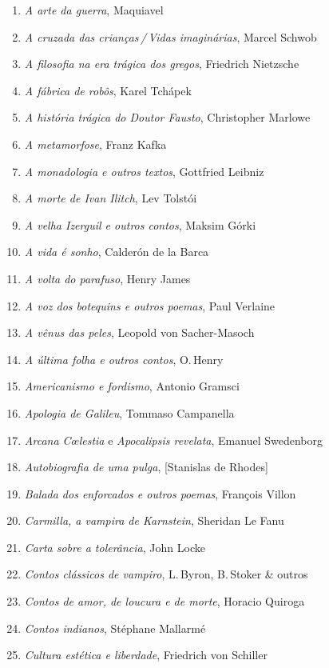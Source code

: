 \begin{enumerate}
\setlength{\topsep}{2pt}
\setlength{\partopsep}{0pt}
\setlength\parskip{4.2pt}
\setlength\itemsep{-1.4mm}
\item \textit{A arte da guerra}, Maquiavel
\item \textit{A cruzada das crianças\,/\,Vidas imaginárias}, Marcel Schwob
\item \textit{A filosofia na era trágica dos gregos}, Friedrich Nietzsche
\item \textit{A fábrica de robôs}, Karel Tchápek 
\item \textit{A história trágica do Doutor Fausto}, Christopher Marlowe
\item \textit{A metamorfose}, Franz Kafka
\item \textit{A monadologia e outros textos}, Gottfried Leibniz
\item \textit{A morte de Ivan Ilitch}, Lev Tolstói 
\item \textit{A velha Izerguil e outros contos}, Maksim Górki
\item \textit{A vida é sonho}, Calderón de la Barca
\item \textit{A volta do parafuso}, Henry James
\item \textit{A voz dos botequins e outros poemas}, Paul Verlaine 
\item \textit{A vênus das peles}, Leopold von Sacher{}-Masoch
\item \textit{A última folha e outros contos}, O.\,Henry
\item \textit{Americanismo e fordismo}, Antonio Gramsci
\item \textit{Apologia de Galileu}, Tommaso Campanella 
\item \textit{Arcana C\oe lestia} e \textit{Apocalipsis revelata}, Emanuel Swedenborg
\item \textit{Autobiografia de uma pulga}, [Stanislas de Rhodes]
\item \textit{Balada dos enforcados e outros poemas}, François Villon
\item \textit{Carmilla, a vampira de Karnstein}, Sheridan Le Fanu
\item \textit{Carta sobre a tolerância}, John Locke
\item \textit{Contos clássicos de vampiro}, L.\,Byron, B.\,Stoker \& outros
\item \textit{Contos de amor, de loucura e de morte}, Horacio Quiroga
\item \textit{Contos indianos}, Stéphane Mallarmé
\item \textit{Cultura estética e liberdade}, Friedrich von Schiller

\end{enumerate}
